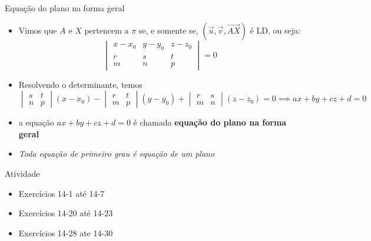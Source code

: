 \begin{frame}{Equação do plano na forma geral}
    \begin{itemize}
        \item Vimos que \(A\) e \(X\) pertencem a \(\pi\) se, e somente se, 
            \((\vec{u},\vec{v},\vec{AX})\) é LD, ou seja:
            \[
                \begin{vmatrix}
                    x-x_0 & y-y_0 & z-z_0 \\
                    r & s & t \\
                    m & n & p
                \end{vmatrix}
                =0
            \]
        \item Resolvendo o determinante, temos
            \[
                \begin{vmatrix}
                    s & t \\ n & p
                \end{vmatrix}
                (x-x_0) -
                \begin{vmatrix}
                    r & t \\ m & p
                \end{vmatrix}
                (y-y_0) +
                \begin{vmatrix}
                    r & s \\ m & n
                \end{vmatrix}
                (z-z_0) =0 \implies ax+ by +cz + d=0
            \]
        \item a equação \(ax+ by +cz + d=0\) é chamada \textbf{equação do plano na forma geral}
        \item \textit{Toda equação de primeiro grau é equação de um plano}
    \end{itemize}
\end{frame}


\begin{frame}{Atividade}
    \begin{itemize}
        \item Exercícios 14-1 até 14-7
        \item Exercícios 14-20 até 14-23
        \item Exercícios 14-28 ate 14-30
    \end{itemize}
\end{frame}

